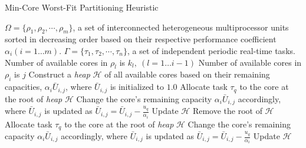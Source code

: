 \documentclass[conference]{IEEEtran}
\begin{document}
\begin{algorithm}
\caption{Min-Core Worst-Fit Partitioning Heuristic} \label{algo:mw}
\footnotesize
\begin{algorithmic}[1]
\REQUIRE $\Omega = \{\rho_1, \rho_2,\cdots, \rho_m\}$, a set of interconnected heterogeneous multiprocessor units
 sorted in decreasing order based on their respective performance coefficient $\alpha_i (i=1\ldots m)$.
 $\Gamma = \{\tau_1, \tau_2, \cdots, \tau_n\}$, a set of independent periodic real-time tasks.
 \label{for1}
	\STATE Number of available cores in $\rho_l$ is $k_l, ~ (l=1 \ldots i-1)$
	 \label{for2}
		\STATE Number of available cores in $\rho_i$ is $j$
		\STATE Construct a \emph{heap} $\mathcal{H}$ of all available cores based on their remaining capacities, $\alpha_i \bar{U}_{i,j}$, where $\bar{U}_{i,j}$ is initialized to $1.0$ \label{heap}
		 \label{worst-start}
			 \label{allocation}
				\STATE Allocate task $\tau_q$ to the core at the root of  \emph{heap} $\mathcal{H}$
\STATE Change the core's remaining capacity $\alpha_i \bar{U}_{i,j}$ accordingly, where $\bar{U}_{i,j}$ is updated as $\bar{U}_{i,j} = \bar{U}_{i,j} - \frac{u_q}{\alpha_i}$
				\STATE \label{end-allo} Update  $\mathcal{H}$
			\ELSE
				\STATE Remove the root of  $\mathcal{H}$ \label{inner-if}
				 \label{while}
					\STATE Allocate task $\tau_q$ to the core at the root of  \emph{heap} $\mathcal{H}$
\STATE Change the core's remaining capacity $\alpha_i \bar{U}_{i,j}$ accordingly, where $\bar{U}_{i,j}$ is updated as $\bar{U}_{i,j} = \bar{U}_{i,j} - \frac{u_q}{\alpha_i}$
				\STATE \label{end-allo1} Update  $\mathcal{H}$


\end{algorithmic}
\end{algorithm}
\end{document}
